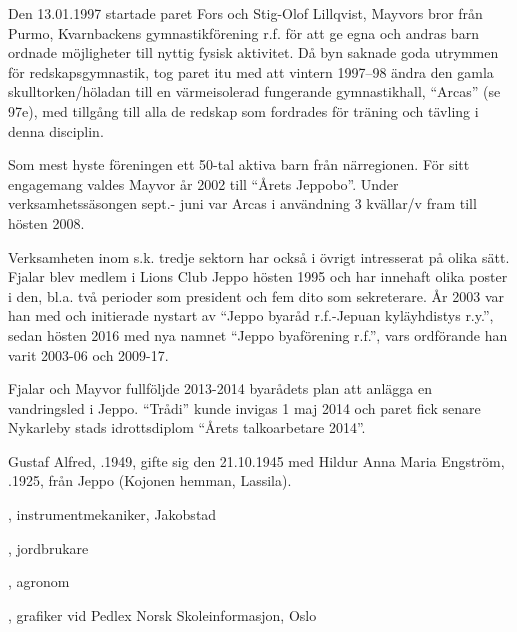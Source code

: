 Den 13.01.1997 startade paret Fors och Stig-Olof Lillqvist, Mayvors	bror från Purmo, Kvarnbackens gymnastikförening r.f. för att ge	egna och andras barn ordnade möjligheter till nyttig fysisk aktivitet. Då byn saknade goda utrymmen för redskapsgymnastik, tog paret itu med att vintern 1997--98 ändra den gamla	skulltorken/höladan till en värmeisolerad fungerande gymnastikhall,	``Arcas'' (se 97e), med tillgång till alla de redskap som fordrades för träning och tävling i denna disciplin.

Som mest hyste föreningen ett 50-tal aktiva barn från närregionen. För sitt engagemang valdes Mayvor år 2002 till ``Årets Jeppobo''. Under verksamhetssäsongen sept.- juni var Arcas i användning 3 kvällar/v fram till hösten 2008.

Verksamheten inom s.k. tredje sektorn har också i övrigt intresserat på olika sätt. Fjalar blev medlem i Lions Club Jeppo hösten 1995 och har innehaft olika poster i den, bl.a. två perioder som president och fem dito som sekreterare. År 2003 var han med och initierade	nystart av ``Jeppo byaråd r.f.-Jepuan kyläyhdistys r.y.'', sedan hösten 2016 med nya namnet ``Jeppo byaförening r.f.'', vars ordförande han varit 2003-06 och 2009-17.

Fjalar och Mayvor fullföljde 2013-2014 byarådets plan att anlägga en vandringsled i Jeppo. ``Trådi'' kunde invigas 1 maj 2014 och paret fick senare Nykarleby stads idrottsdiplom ``Årets talkoarbetare 2014''.






Gustaf Alfred, .1949, gifte sig den 21.10.1945 med Hildur Anna Maria Engström, .1925, från Jeppo (Kojonen hemman, Lassila).
\begin{jhchildren}
  \item {}, instrumentmekaniker, Jakobstad
  \item {}, jordbrukare
  \item {}, agronom
  \item {}, grafiker vid Pedlex Norsk Skoleinformasjon, Oslo
\end{jhchildren}


